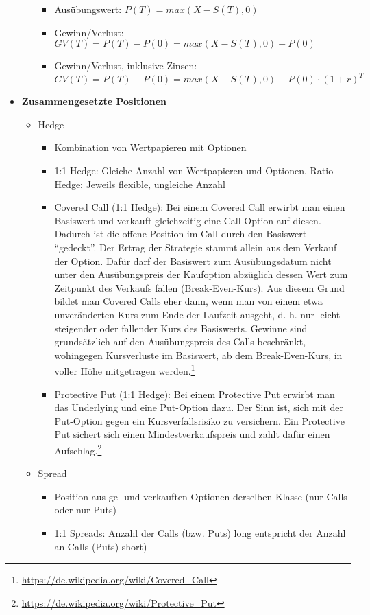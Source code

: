 \begin{itemize}
\begin{itemize}
\begin{itemize}
			\item Ausübungswert: \(P(T)=max(X-S(T),0)\)
			\item Gewinn/Verlust: \(GV(T)=P(T)-P(0) = max(X-S(T),0)-P(0)\)
			\item Gewinn/Verlust, inklusive Zinsen: \(GV(T)=P(T)-P(0) = max(X-S(T),0)-P(0) \cdot (1+r)^T\)
		\end{itemize}
	\end{itemize}
	\item \textbf{Zusammengesetzte Positionen}
	\begin{itemize}
		\item Hedge
		\begin{itemize}
			\item Kombination von Wertpapieren mit Optionen
			\item 1:1 Hedge: Gleiche Anzahl von Wertpapieren und Optionen, Ratio Hedge: Jeweils flexible, ungleiche Anzahl
			\item Covered Call (1:1 Hedge): Bei einem Covered Call erwirbt man einen Basiswert und verkauft gleichzeitig eine Call-Option auf diesen. Dadurch ist die offene Position im Call durch den Basiswert "`gedeckt"'. Der Ertrag der Strategie stammt allein aus dem Verkauf der Option. Dafür darf der Basiswert zum Ausübungsdatum nicht unter den Ausübungspreis der Kaufoption abzüglich dessen Wert zum Zeitpunkt des Verkaufs fallen (Break-Even-Kurs). Aus diesem Grund bildet man Covered Calls eher dann, wenn man von einem etwa unveränderten Kurs zum Ende der Laufzeit ausgeht, d. h. nur leicht steigender oder fallender Kurs des Basiswerts. Gewinne sind grundsätzlich auf den Ausübungspreis des Calls beschränkt, wohingegen Kursverluste im Basiswert, ab dem Break-Even-Kurs, in voller Höhe mitgetragen werden.\footnote{\url{https://de.wikipedia.org/wiki/Covered_Call}}
			\item Protective Put (1:1 Hedge): Bei einem Protective Put erwirbt man das Underlying und eine Put-Option dazu. Der Sinn ist, sich mit der Put-Option gegen ein Kursverfallsrisiko zu versichern. Ein Protective Put sichert sich einen Mindestverkaufspreis und zahlt dafür einen Aufschlag.\footnote{\url{https://de.wikipedia.org/wiki/Protective_Put}}
		\end{itemize}
		\item Spread
		\begin{itemize}
			\item Position aus ge- und verkauften Optionen derselben Klasse (nur Calls oder nur Puts)
			\item 1:1 Spreads: Anzahl der Calls (bzw. Puts) long entspricht der Anzahl an Calls (Puts) short)

\end{itemize}
\end{itemize}
\end{itemize}
